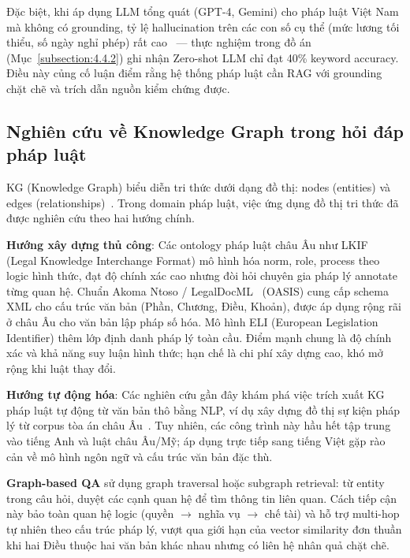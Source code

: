 \documentclass[../DoAn.tex]{subfiles}
\begin{document}
Đặc biệt, khi áp dụng \gls{LLM} tổng quát (GPT-4, Gemini) cho pháp luật Việt Nam mà không có grounding, tỷ lệ hallucination trên các con số cụ thể (mức lương tối thiểu, số ngày nghỉ phép) rất cao~\cite{ji2023hallucination} --- thực nghiệm trong đồ án (Mục~\ref{subsection:4.4.2}) ghi nhận Zero-shot LLM chỉ đạt 40\% keyword accuracy. Điều này củng cố luận điểm rằng hệ thống pháp luật cần RAG với grounding chặt chẽ và trích dẫn nguồn kiểm chứng được.

\subsection{Nghiên cứu về Knowledge Graph trong hỏi đáp pháp luật}
\label{subsection:2.2.2}

\gls{KG} (Knowledge Graph) biểu diễn tri thức dưới dạng đồ thị: nodes (entities) và edges (relationships)~\cite{ji2022kgsurvey,wang2017kgembedding}. Trong domain pháp luật, việc ứng dụng đồ thị tri thức đã được nghiên cứu theo hai hướng chính.

\textbf{Hướng xây dựng thủ công}: Các ontology pháp luật châu Âu như LKIF~\cite{hoekstra2007lkif} (Legal Knowledge Interchange Format) mô hình hóa norm, role, process theo logic hình thức, đạt độ chính xác cao nhưng đòi hỏi chuyên gia pháp lý annotate từng quan hệ. Chuẩn Akoma Ntoso / LegalDocML~\cite{palmirani2018akomantoso} (OASIS) cung cấp schema XML cho cấu trúc văn bản (Phần, Chương, Điều, Khoản), được áp dụng rộng rãi ở châu Âu cho văn bản lập pháp số hóa. Mô hình ELI (European Legislation Identifier) thêm lớp định danh pháp lý toàn cầu. Điểm mạnh chung là độ chính xác và khả năng suy luận hình thức; hạn chế là chi phí xây dựng cao, khó mở rộng khi luật thay đổi.

\textbf{Hướng tự động hóa}: Các nghiên cứu gần đây khám phá việc trích xuất KG pháp luật tự động từ văn bản thô bằng NLP, ví dụ xây dựng đồ thị sự kiện pháp lý từ corpus tòa án châu Âu~\cite{filtz2021legal_kg}. Tuy nhiên, các công trình này hầu hết tập trung vào tiếng Anh và luật châu Âu/Mỹ; áp dụng trực tiếp sang tiếng Việt gặp rào cản về mô hình ngôn ngữ và cấu trúc văn bản đặc thù.

\textbf{Graph-based QA} sử dụng graph traversal hoặc subgraph retrieval: từ entity trong câu hỏi, duyệt các cạnh quan hệ để tìm thông tin liên quan. Cách tiếp cận này bảo toàn quan hệ logic (quyền $\rightarrow$ nghĩa vụ $\rightarrow$ chế tài) và hỗ trợ multi-hop tự nhiên theo cấu trúc pháp lý, vượt qua giới hạn của vector similarity đơn thuần khi hai Điều thuộc hai văn bản khác nhau nhưng có liên hệ nhân quả chặt chẽ.
\end{document}
